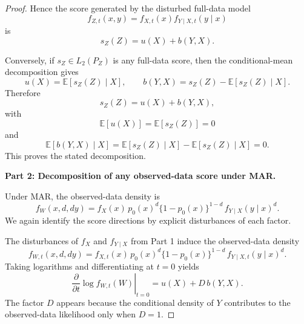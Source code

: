 \documentclass[12pt]{article}
\renewcommand{\(}{\left(}%
\renewcommand{\)}{\right)}%
\renewcommand{\[}{\left[}%
\renewcommand{\]}{\right]}%
\newtheorem{proof}{Proof.}}
\begin{document}
\begin{proof}
Hence the score generated by the disturbed full-data model
\begin{equation*}
f_{Z,t}(x,y)=f_{X,t}(x)f_{Y\mid X,t}(y\mid x)
\end{equation*}
is
\begin{equation*}
s_Z(Z)=u(X)+b(Y,X).
\end{equation*}

Conversely, if $s_Z\in L_2(P_Z)$ is any full-data score, then the conditional-mean decomposition gives
\begin{equation*}
u(X)=\mathbb{E}[s_Z(Z)\mid X],
\qquad
b(Y,X)=s_Z(Z)-\mathbb{E}[s_Z(Z)\mid X].
\end{equation*}
Therefore
\begin{equation*}
s_Z(Z)=u(X)+b(Y,X),
\end{equation*}
with
\begin{equation*}
\mathbb{E}[u(X)]=\mathbb{E}[s_Z(Z)]=0
\end{equation*}
and
\begin{equation*}
\mathbb{E}[b(Y,X)\mid X]
=
\mathbb{E}[s_Z(Z)\mid X]-\mathbb{E}[s_Z(Z)\mid X]
=
0.
\end{equation*}
This proves the stated decomposition.

\medskip
\noindent
\textbf{Part 2: Decomposition of any observed-data score under MAR.}

Under MAR, the observed-data density is
\begin{equation*}
f_W(x,d,dy)
=
f_X(x)\,
p_0(x)^d\{1-p_0(x)\}^{1-d}\,
f_{Y\mid X}(y\mid x)^d .
\end{equation*}
We again identify the score directions by explicit disturbances of each factor.

The disturbances of $f_X$ and $f_{Y\mid X}$ from Part 1 induce the observed-data density
\begin{equation*}
f_{W,t}(x,d,dy)
=
f_{X,t}(x)\,
p_0(x)^d\{1-p_0(x)\}^{1-d}\,
f_{Y\mid X,t}(y\mid x)^d .
\end{equation*}
Taking logarithms and differentiating at $t=0$ yields
\begin{equation*}
\left.\frac{\partial}{\partial t}\log f_{W,t}(W)\right|_{t=0}
=
u(X)+D\,b(Y,X).
\end{equation*}
The factor $D$ appears because the conditional density of $Y$ contributes to the observed-data likelihood only when $D=1$.


\end{proof}
\end{document}
